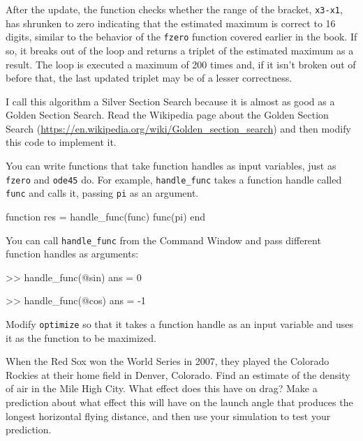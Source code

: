 \documentclass[
]{book}
\numberwithin{Answer}{chapter}
\numberwithin{Exercise}{chapter}
\begin{document}
After the update, 
the function checks whether the range of the bracket, {\tt x3-x1}, has 
shrunken to zero indicating that the estimated maximum is correct to 16 
digits, similar to the behavior of the {\tt fzero} function covered earlier
in the book. 
If so, it breaks out of
the loop and returns a triplet of the estimated maximum as a result.  
The loop is executed a maximum of 200 times and, if it isn't broken
out of before that, the last updated triplet may be of a lesser
correctness.

\begin{ex}
I call this algorithm a Silver Section Search because it is almost as
good as a Golden Section Search.  Read the Wikipedia page about the
Golden Section Search
(\url{https://en.wikipedia.org/wiki/Golden_section_search}) and then
modify this code to implement it.
\end{ex}

\begin{ex}
You can write functions that take function handles as input
variables, just as {\tt fzero} and {\tt ode45} do.
For example, {\tt handle\_func} takes a function handle called
{\tt func} and calls it, passing {\tt pi} as an argument.

\begin{code}
function res = handle_func(func)
    func(pi)
end
\end{code}

You can call {\tt handle\_func} from the Command Window and pass
different function handles as arguments:

\begin{code}
>> handle_func(@sin)
ans = 0

>> handle_func(@cos)
ans = -1
\end{code}

Modify {\tt optimize} so that it takes a function handle
as an input variable and uses it as the function to be
maximized.
\end{ex}

\begin{ex}
When the Red Sox won the World Series in 2007, they played the
Colorado Rockies at their home field in Denver, Colorado.  Find an
estimate of the density of air in the Mile High City.  What effect
does this have on drag?  Make a prediction about what effect this will
have on the launch angle that produces the longest horizontal flying
distance, and then use your simulation to test
your prediction.
\end{ex}
\end{document}
